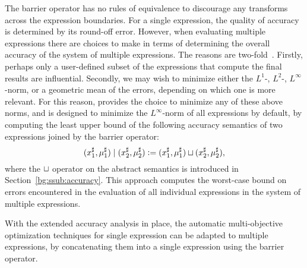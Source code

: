The barrier operator has no rules of equivalence to discourage any transforms
across the expression boundaries.  For a single expression, the quality of
accuracy is determined by its round-off error.  However, when evaluating
multiple expressions there are choices to make in terms of determining the
overall accuracy of the system of multiple expressions.  The reasons are
two-fold~\cite{martel09}.  Firstly, perhaps only a user-defined subset of the
expressions that compute the final results are influential.  Secondly, we may
wish to minimize either the $L^1$-, $L^2$-, $L^\infty$-norm, or a geometric
mean of the errors, depending on which one is more relevant.  For this reason,
\soap{} provides the choice to minimize any of these above norms, and is
designed to minimize the $L^\infty$-norm of all expressions by default, by
computing the least upper bound of the following accuracy semantics of two
expressions joined by the barrier operator:
\begin{equation}
    (x^\sharp_1, \mu^\sharp_1) \mid (x^\sharp_2, \mu^\sharp_2)
    \vcentcolon= (x^\sharp_1, \mu^\sharp_1) \sqcup (x^\sharp_2, \mu^\sharp_2),
\end{equation}
where the $\sqcup$ operator on the abstract semantics is introduced in
Section~\ref{bg:ssub:accuracy}.  This approach computes the worst-case bound
on errors encountered in the evaluation of all individual expressions in the
system of multiple expressions.

With the extended accuracy analysis in place, the automatic multi-objective
optimization techniques for single expression can be adapted to multiple
expressions, by concatenating them into a single expression using the barrier
operator.
